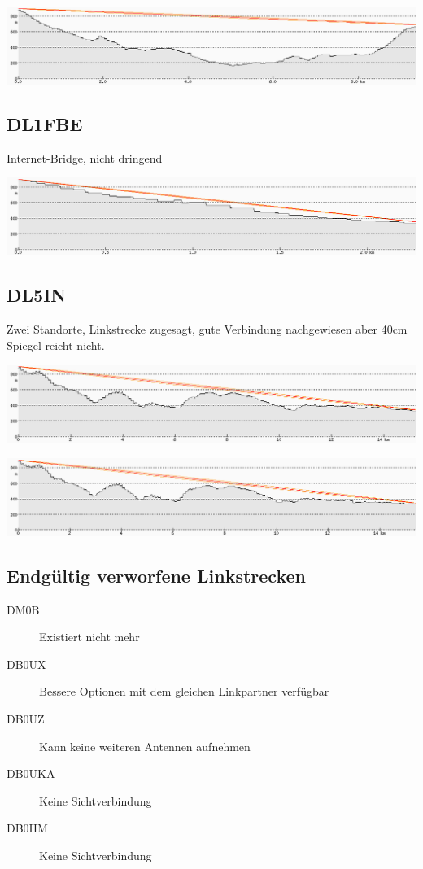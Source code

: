 \documentclass[a4paper]{scrartcl}
\begin{document}
\includegraphics[width=\linewidth]{Bilder/Profil_DB0SWF}

\subsection{DL1FBE}
Internet-Bridge, nicht dringend

\includegraphics[width=\linewidth]{Bilder/Profil_DL1FBE}

\subsection{DL5IN}
Zwei Standorte, Linkstrecke zugesagt, gute Verbindung nachgewiesen aber 40cm Spiegel reicht nicht.



\includegraphics[width=\linewidth]{Bilder/Profil_DL5IN_48_877408_8_507792.png}

\includegraphics[width=\linewidth]{Bilder/Profil_DL5IN_48_877956_8_511058.png}

\subsection{Endg\"ultig verworfene Linkstrecken}
\begin{description}
    \item[DM0B] Existiert nicht mehr
    \item[DB0UX] Bessere Optionen mit dem gleichen Linkpartner verf\"ugbar
    \item[DB0UZ] Kann keine weiteren Antennen aufnehmen
    \item[DB0UKA] Keine Sichtverbindung
    \item[DB0HM] Keine Sichtverbindung
\end{description}
\end{document}
